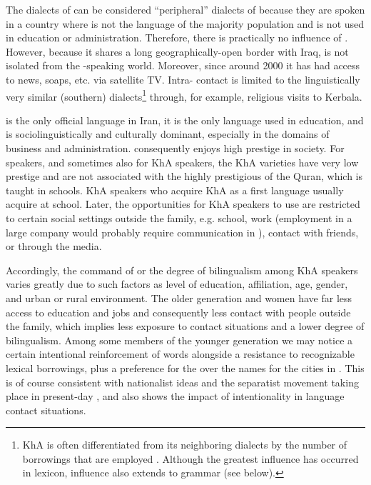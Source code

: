 \documentclass[output=paper,nonflat]{langsci/langscibook}
\begin{document}
The dialects of  can be considered “peripheral” dialects of  because they are spoken in a country where  is not the language of the majority population and is not used in education or administration. Therefore, there is practically no influence of  . However, because it shares a long geographically-open border with Iraq,  is not isolated from the -speaking world. Moreover, since around 2000 it has had access to  news, soaps, etc. via satellite TV. Intra- contact is limited to the linguistically very similar (southern)  dialects\footnote{KhA is often differentiated from its neighboring  dialects by the number of  borrowings that are employed \citep[1020]{Gazsi2011}. Although the greatest influence has occurred in lexicon,  influence also extends to grammar (see below).} through, for example, religious visits to Kerbala.

 is the only official language in Iran, it is the only language used in education, and is sociolinguistically and culturally dominant, especially in the domains of business and administration.  consequently enjoys high {prestige} in society. For  speakers, and sometimes also for KhA speakers, the KhA varieties have very low {prestige} and are not associated with the highly {prestigious}  of the {Quran}, which is taught in schools. KhA speakers who acquire KhA as a first language usually acquire  at school. Later, the opportunities for KhA speakers to use  are restricted to certain social settings outside the family, e.g. school, work (employment in a large company would probably require communication in ), contact with  friends, or through the  media.

Accordingly, the command of  or the degree of {bilingualism} among KhA speakers varies greatly due to such factors as level of education, affiliation, age, {gender}, and urban or rural environment. The older generation and women have far less access to education and jobs and consequently less contact with people outside the family, which implies less exposure to contact situations and a lower degree of {bilingualism}. Among some members of the younger generation we may notice a certain intentional reinforcement of  words alongside a resistance to recognizable  lexical borrowings, plus a preference for the  over the  names for the cities in . This is of course consistent with nationalist ideas and the separatist movement taking place in present-day , and also shows the impact of intentionality in language contact situations. 
\end{document}
